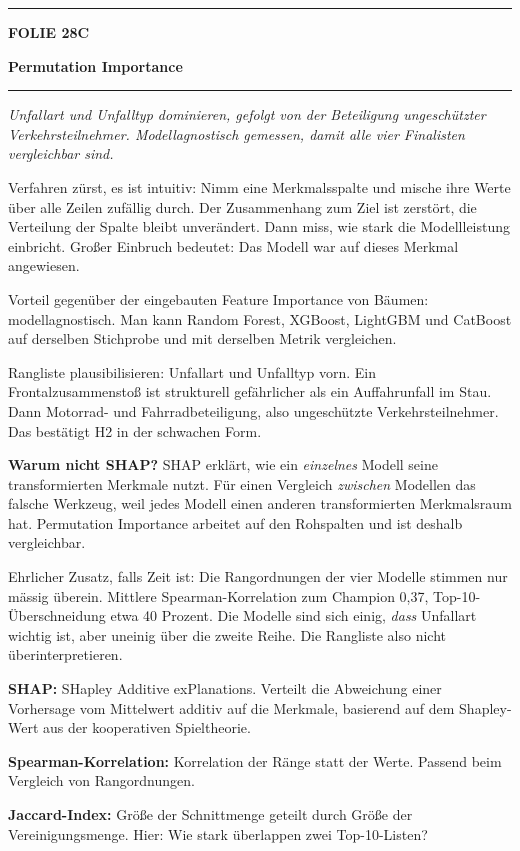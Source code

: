 \documentclass[9pt]{extarticle}
\newcommand{\karte}[3]{%
  \clearpage
  {\color{Accent}\rule{\linewidth}{2.4pt}}\par\vspace{2.5pt}
  {\fontsize{8}{9}\selectfont\bfseries\color{Accent}%
   FOLIE #1\hspace{1.2em}\textbar\hspace{1.2em}#2}\par\vspace{1pt}
  {\fontsize{16}{18}\selectfont\bfseries\color{AccentDark}#3}\par\vspace{3pt}
  {\color{Accent!45}\rule{\linewidth}{0.5pt}}\par\vspace{4pt}%
}
\newcommand{\rubrik}[1]{%
  \vspace{3.5pt}{\fontsize{7.5}{8.5}\selectfont\bfseries\color{Grau}%
  \MakeUppercase{#1}}\par\vspace{1.5pt}}
\newcommand{\kernsatz}[1]{%
  \begin{tcolorbox}[enhanced,sharp corners,boxrule=0pt,
    leftrule=2.2pt,colframe=Accent,colback=AccentPale,
    left=5pt,right=5pt,top=3.5pt,bottom=3.5pt,before skip=1pt,after skip=2pt]
    \color{AccentDark}\itshape #1
  \end{tcolorbox}}
\newcommand{\bg}[2]{\item \textbf{#1:} #2}
\begin{document}
\karte{28}{C}{Permutation Importance}

\kernsatz{Unfallart und Unfalltyp dominieren, gefolgt von der Beteiligung ungeschützter
Verkehrsteilnehmer. Modellagnostisch gemessen, damit alle vier Finalisten vergleichbar sind.}

\rubrik{Sagen}
\begin{sag}
  \item Verfahren zürst, es ist intuitiv: Nimm eine Merkmalsspalte und mische ihre Werte über
        alle Zeilen zufällig durch. Der Zusammenhang zum Ziel ist zerstört, die Verteilung der
        Spalte bleibt unverändert. Dann miss, wie stark die Modellleistung einbricht. Großer
        Einbruch bedeutet: Das Modell war auf dieses Merkmal angewiesen.
  \item Vorteil gegenüber der eingebauten Feature Importance von Bäumen: modellagnostisch. Man
        kann Random Forest, XGBoost, LightGBM und CatBoost auf derselben Stichprobe und mit
        derselben Metrik vergleichen.
  \item Rangliste plausibilisieren: Unfallart und Unfalltyp vorn. Ein Frontalzusammenstoß ist
        strukturell gefährlicher als ein Auffahrunfall im Stau. Dann Motorrad- und
        Fahrradbeteiligung, also ungeschützte Verkehrsteilnehmer. Das bestätigt H2 in der
        schwachen Form.
  \item \textbf{Warum nicht SHAP?} SHAP erklärt, wie ein \textit{einzelnes} Modell seine
        transformierten Merkmale nutzt. Für einen Vergleich \textit{zwischen} Modellen das falsche
        Werkzeug, weil jedes Modell einen anderen transformierten Merkmalsraum hat. Permutation
        Importance arbeitet auf den Rohspalten und ist deshalb vergleichbar.
  \item Ehrlicher Zusatz, falls Zeit ist: Die Rangordnungen der vier Modelle stimmen nur mässig
        überein. Mittlere Spearman-Korrelation zum Champion 0,37, Top-10-Überschneidung etwa
        40 Prozent. Die Modelle sind sich einig, \textit{dass} Unfallart wichtig ist, aber uneinig
        über die zweite Reihe. Die Rangliste also nicht überinterpretieren.
\end{sag}

\rubrik{Begriffe}
\begin{begriff}
  \bg{SHAP}{SHapley Additive exPlanations. Verteilt die Abweichung einer Vorhersage vom Mittelwert
      additiv auf die Merkmale, basierend auf dem Shapley-Wert aus der kooperativen Spieltheorie.}
  \bg{Spearman-Korrelation}{Korrelation der Ränge statt der Werte. Passend beim Vergleich von
      Rangordnungen.}
  \bg{Jaccard-Index}{Größe der Schnittmenge geteilt durch Größe der Vereinigungsmenge.
      Hier: Wie stark überlappen zwei Top-10-Listen?}
\end{begriff}
\end{document}
